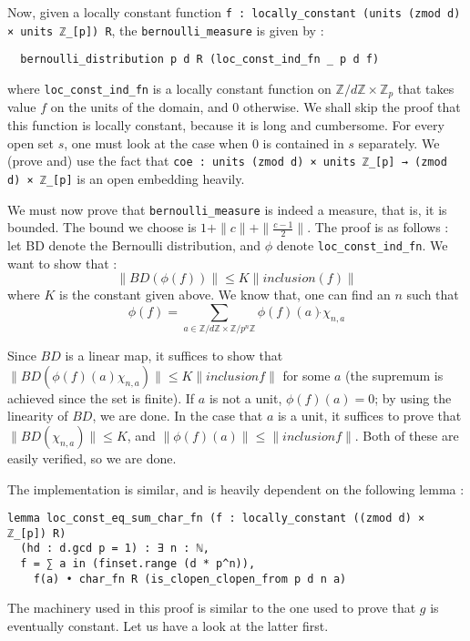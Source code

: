 \documentclass[a4paper,UKenglish,cleveref, autoref, thm-restate]{lipics-v2021}
\newcommand{\lean}[1]{\texttt{#1}\xspace} %
\begin{document}
Now, given a locally constant function \lean{f : locally\_constant (units (zmod d) × units ℤ\_[p]) R}, 
the \lean{bernoulli\_measure} is given by : 
\begin{lstlisting}
  bernoulli_distribution p d R (loc_const_ind_fn _ p d f)
\end{lstlisting}
where \lean{loc\_const\_ind\_fn} is a locally constant function on $\mathbb{Z}/d \mathbb{Z} \times \mathbb{Z}_p$ 
that takes value $f$ on the units of the domain, and 0 otherwise. We shall skip the proof that this function is 
locally constant, because it is long and cumbersome. For every open set $s$, one must look at the case when 0 is 
contained in $s$ separately. We (prove and) use the fact that \lean{coe : units (zmod d) × units ℤ\_[p] → (zmod d) × ℤ\_[p]} 
is an open embedding heavily. 

We must now prove that \lean{bernoulli\_measure} is indeed a measure, that is, it is bounded. The bound we choose is 
$1 + \parallel c \parallel + \parallel \frac{c - 1}{2} \parallel$. The proof is as follows : let BD denote the Bernoulli 
distribution, and $\phi$ denote \lean{loc\_const\_ind\_fn}. We want to show that : 
$$ \parallel BD (\phi (f)) \parallel \le K \parallel inclusion (f) \parallel $$
where $K$ is the constant given above. We know that, one can find an $n$ such that 
$$\phi (f) = \sum_{a \in \mathbb{Z}/d \mathbb{Z} \times \mathbb{Z} /p^n \mathbb{Z}} \phi(f) (a) \dot{} \chi_{n,a}$$

Since $BD$ is a linear map, it suffices to show that 
$\parallel BD (\phi (f)(a) \chi_{n, a}) \parallel \le K \parallel inclusion f \parallel$ for some $a$ (the supremum is achieved 
since the set is finite). If $a$ is not a unit, $\phi (f) (a) = 0$; by using the linearity of $BD$, we are done. 
In the case that $a$ is a unit, it suffices to prove that $\parallel BD(\chi_{n, a}) \parallel \le K$, and 
$\parallel \phi (f) (a) \parallel \le \parallel inclusion f \parallel$. Both of these are easily verified, so we are done. 

The implementation is similar, and is heavily dependent on the following lemma : 
\begin{lstlisting}
lemma loc_const_eq_sum_char_fn (f : locally_constant ((zmod d) × ℤ_[p]) R) 
  (hd : d.gcd p = 1) : ∃ n : ℕ, 
  f = ∑ a in (finset.range (d * p^n)), 
    f(a) • char_fn R (is_clopen_clopen_from p d n a)
\end{lstlisting}

The machinery used in this proof is similar to the one used to prove that $g$ is eventually constant. Let us have a look at the latter first. 
\end{document}
